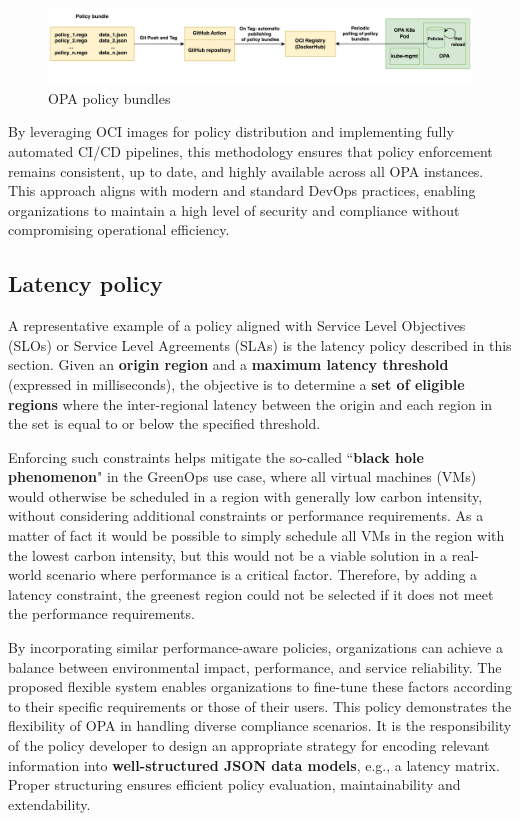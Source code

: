 \begin{figure}[H]
\centering
\includegraphics[width=1\linewidth]{images/opa_bundles.png}
\caption{OPA policy bundles}
\label{fig:opa_bundles}
\end{figure}

By leveraging OCI images for policy distribution and implementing fully automated CI/CD pipelines, this methodology ensures that policy enforcement remains consistent, up to date, and highly available across all OPA instances. 
This approach aligns with modern and standard DevOps practices, enabling organizations to maintain a high level of security and compliance without compromising operational efficiency.

\subsection{Latency policy}

A representative example of a policy aligned with Service Level Objectives (SLOs) or Service Level Agreements (SLAs) is the latency policy described in this section.
Given an \textbf{origin region} and a \textbf{maximum latency threshold} (expressed in milliseconds), the objective is to determine a \textbf{set of eligible regions} where the inter-regional latency between the origin and each region in the set is equal to or below the specified threshold.

Enforcing such constraints helps mitigate the so-called ``\textbf{black hole phenomenon}" in the GreenOps use case, where all virtual machines (VMs) would otherwise be scheduled in a region with generally low carbon intensity, without considering additional constraints or performance requirements.
As a matter of fact it would be possible to simply schedule all VMs in the region with the lowest carbon intensity, but this would not be a viable solution in a real-world scenario where performance is a critical factor.
Therefore, by adding a latency constraint, the greenest region could not be selected if it does not meet the performance requirements.

By incorporating similar performance-aware policies, organizations can achieve a balance between environmental impact, performance, and service reliability.
The proposed flexible system enables organizations to fine-tune these factors according to their specific requirements or those of their users. 
This policy demonstrates the flexibility of OPA in handling diverse compliance scenarios. It is the responsibility of the policy developer to design an appropriate strategy for encoding relevant information into \textbf{well-structured JSON data models}, e.g., a latency matrix. Proper structuring ensures efficient policy evaluation, maintainability and extendability.

